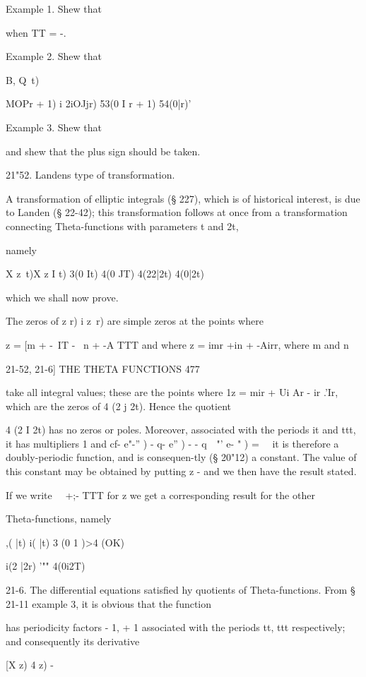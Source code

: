 Example 1. Shew that

when TT = -.

Example 2. Shew that

B, Q\ t) \ %

MOPr + 1) i 2iOJjr) 53(0 I r + 1) 54(0|r)'

Example 3. Shew that

and shew that the plus sign should be taken.

21"52. Landens type of transformation.

A transformation of elliptic integrals (§ 227), which is of historical
interest, is due to Landen (§ 22-42); this transformation follows at
once from a transformation connecting Theta-functions with parameters
t and 2t,

namely

X z\ t)X z I t) 3(0 It) 4(0 JT) 4(22|2t) 4(0|2t)

which we shall now prove.

The zeros of z r) i z\ r) are simple zeros at the points where

z = [m + -\ IT - \ n + -A TTT and where z = imr +in + -Airr, where m
and n

21-52, 21-6] THE THETA FUNCTIONS 477

take all integral values; these are the points where 1z = mir + Ui Ar
- ir .'Ir, which are the zeros of 4 (2 j 2t). Hence the quotient

 4 (2 I 2t) has no zeros or poles. Moreover, associated with the
periods it and ttt, it has multipliers 1 and cf- e"-'' ) - q- e'' ) -
- q~~"' e- " ) = \ \ it is therefore a doubly-periodic function, and
is consequen-tly (§ 20"12) a constant. The value of this constant may
be obtained by putting z - and we then have the result stated.

If we write \ \ +;- TTT for z we get a corresponding result for the
other

Theta-functions, namely

,( |t) i( |t) 3 (0 1 )>4 (OK)

 i(2 |2r) '"" 4(0i2T)

21-6. The differential equations satisfied hy quotients of
Theta-functions. From § 21-11 example 3, it is obvious that the
function

has periodicity factors - 1, + 1 associated with the periods tt, ttt
respectively; and consequently its derivative

[X z) 4 z) - %

